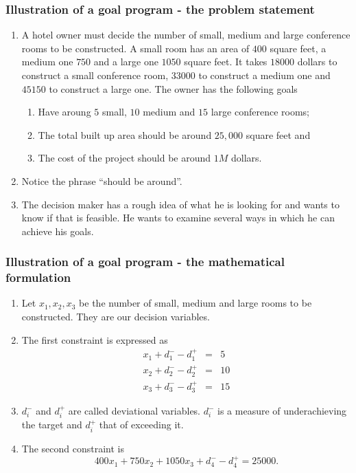 \documentclass{beamer}
\begin{document}
\begin{frame}
\frametitle{Illustration of a goal program - the problem statement}
\begin{enumerate}
\item A hotel owner must decide the number of small, medium and large conference
rooms to be constructed. A small room has an area of $400$ square feet, a medium
one $750$ and a large one $1050$ square feet. It takes $18000$ dollars to 
construct a small conference room, $33000$ to construct a medium one and $45150$ 
to construct a large one. The owner has the following goals
\begin{enumerate}
\item Have aroung $5$ small, $10$ medium and $15$ large conference rooms;
\item The total built up area should be around $25,000$ square feet and
\item The cost of the project should be around $1 M$ dollars. 
\end{enumerate}
\item Notice the phrase ``should be around''.
\item The decision maker has a rough idea of what he is looking for and wants to 
know if that is feasible. He wants to examine several ways in which he can 
achieve his goals.
\end{enumerate}
\end{frame}

\begin{frame}
\frametitle{Illustration of a goal program - the mathematical formulation}
\begin{enumerate}
\item Let $x_1, x_2, x_3$ be the number of small, medium and large rooms to be
constructed. They are our decision variables. 
\item The first constraint is expressed as
\begin{eqnarray}
x_1 + d_1^- - d_1^+ &=& 5 \label{e4} \\
x_2 + d_2^- - d_2^+ &=& 10 \label{e5} \\
x_3 + d_3^- - d_3^+ &=& 15 \label{e6}
\end{eqnarray}
\item $d_i^-$ and $d_i^+$ are called deviational variables. $d_i^-$ is a measure
of underachieving the target and $d_i^+$ that of exceeding it.
\item The second constraint is
\begin{equation}\label{e7}
400x_1 + 750 x_2 + 1050x_3 + d_4^- - d_4^+ = 25000.
\end{equation}
\end{enumerate}
\end{frame}
\end{document}

